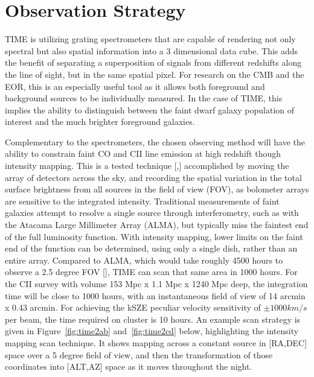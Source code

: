 \documentclass[manuscript]{aastex}
\begin{document}
\newpage
\section{Observation Strategy}

TIME is utilizing grating spectrometers that are capable of rendering not only spectral but also spatial information into a 3 dimensional data cube. This adds the benefit of separating a superposition of signals from different redshifts along the line of sight, but in the same spatial pixel. For research on the CMB and the EOR, this is an especially useful tool as it allows both foreground and background sources to be individually measured. In the case of TIME, this implies the ability to distinguish between the faint dwarf galaxy population of interest and the much brighter foreground galaxies. 

Complementary to the spectrometers, the chosen observing method will have the ability to constrain faint CO and CII line emission at high redshift though intensity mapping. This is a tested technique [\cite{Keating2015},\cite{Keating2016}] accomplished by moving the array of detectors across the sky, and recording the spatial variation in the total surface brightness from all sources in the field of view (FOV), as bolometer arrays are sensitive to the integrated intensity. Traditional measurements of faint galaxies attempt to resolve a single source through interferometry, such as with the Atacama Large Millimeter Array (ALMA), but typically miss the faintest end of the full luminosity function. With intensity mapping, lower limits on the faint end of the function can be determined, using only a single dish, rather than an entire array. Compared to ALMA, which would take roughly 4500 hours to observe a 2.5 degree FOV [\cite{Kovetz2017}], TIME can scan that same area in 1000 hours. For the CII survey with volume 153 Mpc x 1.1 Mpc x 1240 Mpc deep, the integration time will be close to 1000 hours, with an instantaneous field of view of 14 arcmin x 0.43 arcmin. For achieving the kSZE peculiar velocity sensitivity of $\pm 1000 km/s$ per beam, the time required on cluster is 10 hours. An example scan strategy is given in Figure~\ref{fig:time2ab} and~\ref{fig:time2cd} below, highlighting the intensity mapping scan technique. It shows mapping across a constant source in [RA,DEC] space over a 5 degree field of view, and then the transformation of those coordinates into [ALT,AZ] space as it moves throughout the night.
\end{document}
